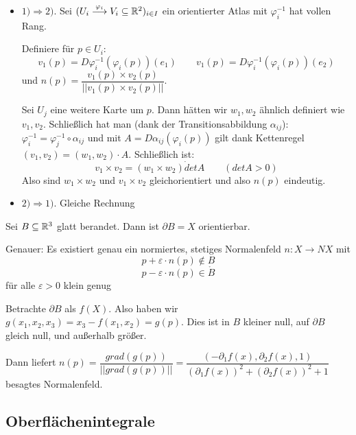\documentclass[main.tex]{subfiles}
\begin{document}
\begin{Beweis}[Ursprünglich ÜA]
  \begin{itemize}
    \item $1) \Rightarrow 2)$. Sei $(U_i \stackrel{\varphi_i}{\longrightarrow} V_i \subseteq \mathbb{R}^2)_{i \in I}$ ein orientierter Atlas mit $\varphi_i^{-1}$ hat vollen Rang.

      Definiere für $p \in U_i$:
      $$v_1(p) = D \varphi_i^{-1} (\varphi_i(p))(e_1) \qquad v_1(p) = D \varphi_i^{-1} (\varphi_i(p))(e_2)$$
      und $n(p) = \dfrac{v_1(p) \times v_2(p)}{||v_1(p) \times v_2(p)||}$.

      Sei $U_j$ eine weitere Karte um $p$. Dann hätten wir $w_1,w_2$ ähnlich definiert wie $v_1, v_2$. Schließlich hat man (dank der Transitionsabbildung $\alpha_{ij}$): $\varphi_i^{-1} = \varphi_j^{-1} \circ \alpha_{ij}$ und mit $A = D \alpha_{ij}(\varphi_i(p))$ gilt dank Kettenregel $(v_1,v_2) = (w_1,w_2) \cdot A$. Schließlich ist:
      $$v_{1} \times v_{2} = (w_{1} \times w_{2}) \dot det A \qquad (det A > 0)$$
      Also sind $w_1 \times w_2$ und $v_1 \times v_2$ gleichorientiert und also $n(p)$ eindeutig.
    \item $2) \Rightarrow 1)$. Gleiche Rechnung
  \end{itemize}
\end{Beweis}

\begin{Korollar}
  Sei $B \subseteq \mathbb{R}^3$ glatt berandet. Dann ist $\partial B = X$ orientierbar.

  Genauer: Es existiert genau ein normiertes, stetiges Normalenfeld $n : X \to NX$ mit
  $$p + \varepsilon \cdot n(p) \notin B$$
  $$p - \varepsilon \cdot n(p) \in \mathring{B}$$
  für alle $\varepsilon > 0$ klein genug
\end{Korollar}

\begin{Beweis}
  Betrachte $\partial B$ als $f(X)$. Also haben wir $g(x_1,x_2,x_3) = x_3 - f(x_1,x_2) = g(p)$. Dies ist in $B$ kleiner null, auf $\partial B$ gleich null, und außerhalb größer.

  Dann liefert $n(p) = \dfrac{grad(g(p))}{||grad(g(p))||} = \dfrac{(-\partial_1 f(x),\partial_2 f(x), 1)}{(\partial_1 f(x))^2 + (\partial_2 f(x))^2 + 1}$ besagtes Normalenfeld.
\end{Beweis}


\subsection{Oberflächenintegrale}
\end{document}
